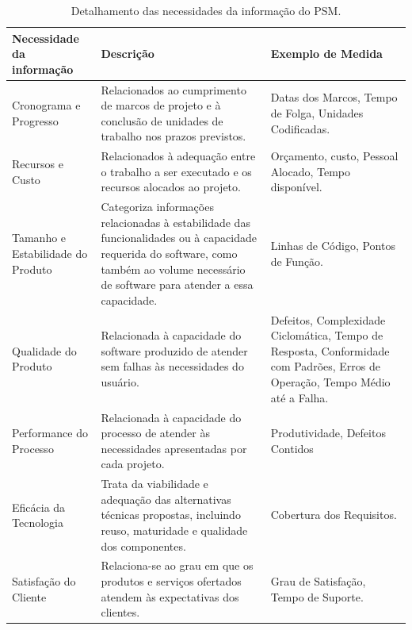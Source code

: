 
\begin{longtable}{|p{100pt}|p{220pt}|p{105pt}|}
 	\caption{Detalhamento das necessidades da informação do PSM.\cite{bailey}} \label{tipos_metricas}\\
 	\hline
 	 {\raggedright \textbf{Necessidade da informação}}
 	 & {\raggedright \textbf{Descrição}}
 	 & {\raggedright \textbf{Exemplo de Medida}}\\
 	\hline
 	 {\raggedright Cronograma e Progresso}
 	 & {\raggedright Relacionados ao  cumprimento de marcos de projeto e à conclusão de unidades de trabalho nos prazos previstos. }
 	 & {\raggedright Datas dos Marcos, Tempo de Folga, Unidades Codificadas.}\\
 	\hline
 	 {\raggedright Recursos e Custo}
 	 & {\raggedright Relacionados à adequação entre o trabalho a ser executado e os recursos alocados ao projeto.}
 	 & {\raggedright Orçamento, custo, Pessoal Alocado, Tempo disponível.}\\
 	\hline
 	 {\raggedright Tamanho e Estabilidade do Produto} 
 	 & {\raggedright Categoriza informações relacionadas à estabilidade das funcionalidades ou à capacidade requerida do software, como também ao volume necessário de software para atender a essa capacidade.}
	  & {\raggedright Linhas de Código, Pontos de Função.}\\
 	\hline
 	 {\raggedright Qualidade do Produto}
 	 & {\raggedright Relacionada à capacidade do software produzido de atender sem falhas às necessidades do usuário.}
 	 & {\raggedright Defeitos, Complexidade Ciclomática, Tempo de Resposta, Conformidade com Padrões, Erros de Operação, Tempo Médio até a Falha.} \\
 	\hline
 	{\raggedright Performance do Processo}
 	 & {\raggedright Relacionada à capacidade do processo de atender às necessidades apresentadas por cada projeto.}
 	 & {\raggedright Produtividade, Defeitos Contidos} \\
 	\hline
 	{\raggedright Eficácia da Tecnologia}
 	 & {\raggedright Trata da viabilidade e adequação das alternativas técnicas propostas, incluindo reuso, maturidade e qualidade dos componentes.}
 	 & {\raggedright Cobertura dos Requisitos.} \\
 	\hline
 	{\raggedright Satisfação do Cliente}
 	 & {\raggedright Relaciona-se ao grau em que os produtos e serviços ofertados atendem às expectativas dos clientes.}
 	 & {\raggedright Grau de Satisfação, Tempo de Suporte.} \\
 	\hline
 	\end{longtable}

